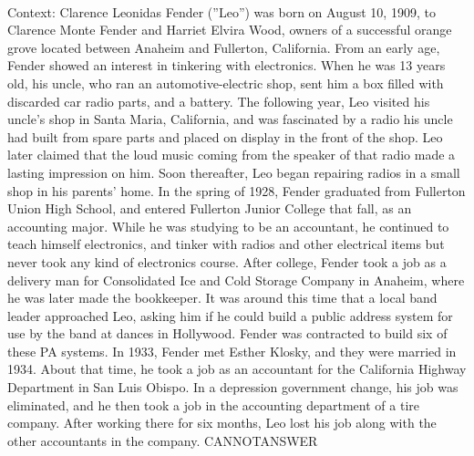 \documentclass[11pt,a4paper, onecolumn]{article}
\begin{document}
\\ Context: Clarence Leonidas Fender (''Leo'') was born on August 10, 1909, to Clarence Monte Fender and Harriet Elvira Wood, owners of a successful orange grove located between Anaheim and Fullerton, California. From an early age, Fender showed an interest in tinkering with electronics. When he was 13 years old, his uncle, who ran an automotive-electric shop, sent him a box filled with discarded car radio parts, and a battery. The following year, Leo visited his uncle's shop in Santa Maria, California, and was fascinated by a radio his uncle had built from spare parts and placed on display in the front of the shop. Leo later claimed that the loud music coming from the speaker of that radio made a lasting impression on him. Soon thereafter, Leo began repairing radios in a small shop in his parents' home. In the spring of 1928, Fender graduated from Fullerton Union High School, and entered Fullerton Junior College that fall, as an accounting major. While he was studying to be an accountant, he continued to teach himself electronics, and tinker with radios and other electrical items but never took any kind of electronics course. After college, Fender took a job as a delivery man for Consolidated Ice and Cold Storage Company in Anaheim, where he was later made the bookkeeper. It was around this time that a local band leader approached Leo, asking him if he could build a public address system for use by the band at dances in Hollywood. Fender was contracted to build six of these PA systems. In 1933, Fender met Esther Klosky, and they were married in 1934. About that time, he took a job as an accountant for the California Highway Department in San Luis Obispo. In a depression government change, his job was eliminated, and he then took a job in the accounting department of a tire company. After working there for six months, Leo lost his job along with the other accountants in the company. CANNOTANSWER
\end{document}
